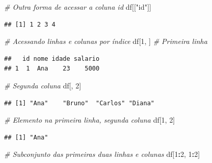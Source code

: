 \documentclass[
]{book}
\newenvironment{Shaded}{\begin{snugshade}}{\end{snugshade}}
\newcommand{\CommentTok}[1]{\textcolor[rgb]{0.56,0.35,0.01}{\textit{#1}}}
\newcommand{\DecValTok}[1]{\textcolor[rgb]{0.00,0.00,0.81}{#1}}
\newcommand{\NormalTok}[1]{#1}
\newcommand{\SpecialCharTok}[1]{\textcolor[rgb]{0.81,0.36,0.00}{\textbf{#1}}}
\newcommand{\StringTok}[1]{\textcolor[rgb]{0.31,0.60,0.02}{#1}}
\begin{document}
\begin{Shaded}
\begin{Highlighting}[]
\CommentTok{\# Outra forma de acessar a coluna id}
\NormalTok{df[[}\StringTok{"id"}\NormalTok{]]}
\end{Highlighting}
\end{Shaded}

\begin{verbatim}
## [1] 1 2 3 4
\end{verbatim}

\begin{Shaded}
\begin{Highlighting}[]
\CommentTok{\# Acessando linhas e colunas por índice}
\NormalTok{df[}\DecValTok{1}\NormalTok{, ] }\CommentTok{\# Primeira linha}
\end{Highlighting}
\end{Shaded}

\begin{verbatim}
##   id nome idade salario
## 1  1  Ana    23    5000
\end{verbatim}

\begin{Shaded}
\begin{Highlighting}[]
\CommentTok{\# Segunda coluna}
\NormalTok{df[, }\DecValTok{2}\NormalTok{] }
\end{Highlighting}
\end{Shaded}

\begin{verbatim}
## [1] "Ana"    "Bruno"  "Carlos" "Diana"
\end{verbatim}

\begin{Shaded}
\begin{Highlighting}[]
\CommentTok{\# Elemento na primeira linha, segunda coluna}
\NormalTok{df[}\DecValTok{1}\NormalTok{, }\DecValTok{2}\NormalTok{] }
\end{Highlighting}
\end{Shaded}

\begin{verbatim}
## [1] "Ana"
\end{verbatim}

\begin{Shaded}
\begin{Highlighting}[]
\CommentTok{\# Subconjunto das primeiras duas linhas e colunas}
\NormalTok{df[}\DecValTok{1}\SpecialCharTok{:}\DecValTok{2}\NormalTok{, }\DecValTok{1}\SpecialCharTok{:}\DecValTok{2}\NormalTok{] }
\end{Highlighting}
\end{Shaded}
\end{document}
